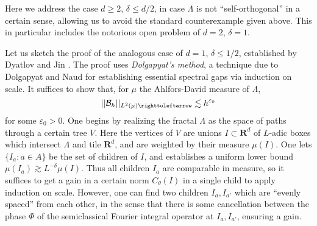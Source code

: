 \documentclass[reqno,10pt]{amsart}
\newcommand{\RR}{\mathbf{R}}
\newcommand{\dfn}[1]{\emph{#1}\index{#1}}
\theoremstyle{definition}
\numberwithin{equation}{section}
\begin{document}
Here we address the case $d \geq 2$, $\delta \leq d/2$, in case $\Lambda$ is not ``self-orthogonal'' in a certain sense, allowing us to avoid the standard counterexample given above.
This in particular includes the notorious open problem of $d = 2$, $\delta = 1$.

Let us sketch the proof of the analogous case of $d = 1$, $\delta \leq 1/2$, established by Dyatlov and Jin \cite{Dyatlov_2018}.
The proof uses \dfn{Dolgapyat's method}, a technique due to Dolgapyat and Naud \cite{10.2307/121012, ASENS_2005_4_38_1_116_0} for establishing essential spectral gaps via induction on scale.
It suffices to show that, for $\mu$ the Ahlfors-David measure of $\Lambda$,
$$||\mathcal B_h||_{L^2(\mu) \righttoleftarrow} \lesssim h^{\varepsilon_0}$$
for some $\varepsilon_0 > 0$.
One begins by realizing the fractal $\Lambda$ as the space of paths through a certain tree $V$.
Here the vertices of $V$ are unions $I \subset \RR^d$ of $L$-adic boxes which intersect $\Lambda$ and tile $\RR^d$, and are weighted by their measure $\mu(I)$.
One lets $\{I_a: a \in A\}$ be the set of children of $I$, and establishes a uniform lower bound $\mu(I_a) \gtrsim L^{-\delta} \mu(I)$.
Thus all children $I_a$ are comparable in measure, so it suffices to get a gain in a certain norm $C_\theta(I)$ in a single child to apply induction on scale.
However, one can find two children $I_a, I_{a'}$ which are ``evenly spaced'' from each other, in the sense that there is some cancellation between the phase $\Phi$ of the semiclassical Fourier integral operator at $I_a, I_{a'}$, ensuring a gain.
\end{document}
